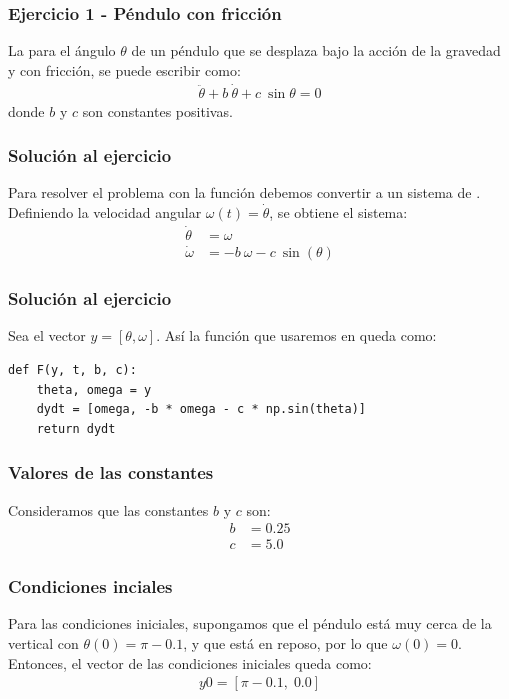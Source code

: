 \documentclass[12pt]{beamer}
\begin{document}
\begin{frame}
\frametitle{Ejercicio 1 - Péndulo con fricción}
La  para el ángulo $\theta$ de un péndulo que se desplaza bajo la acción de la gravedad y con fricción, se puede escribir como:
\pause
\begin{align*}
\ddot{\theta} +  b \: \dot{\theta} +  c \: \sin \theta = 0 
\end{align*}
donde $b$ y $c$ son constantes positivas.
\end{frame}
\begin{frame}
\frametitle{Solución al ejercicio}
Para resolver el problema con la función  debemos convertir a un sistema de .
\\
\bigskip
\pause
Definiendo la velocidad angular $\omega (t) = \dot{\theta}$, se obtiene el sistema:
\pause
\begin{align*}
\dot{\theta} &= \omega \\
\dot{\omega} &= -b \:\omega - c \: \sin(\theta)
\end{align*}
\end{frame}
\begin{frame}[fragile]
\frametitle{Solución al ejercicio}
Sea el vector $y =  [\theta, \omega]$. Así la función que usaremos en \python{} queda como:
\begin{lstlisting}[caption=Función a integrar para el ejecicio del péndulo]
def F(y, t, b, c):
    theta, omega = y
    dydt = [omega, -b * omega - c * np.sin(theta)]
    return dydt
\end{lstlisting}
\end{frame}
\begin{frame}
\frametitle{Valores de las constantes}
Consideramos que las constantes $b$ y $c$ son:
\begin{align*}
b &= 0.25 \\
c &= 5.0
\end{align*} 
\end{frame}
\begin{frame}
\frametitle{Condiciones inciales}
Para las condiciones iniciales, supongamos que el péndulo está muy cerca de la vertical con $\theta(0) = \pi - 0.1$, y que está en reposo, por lo que $\omega(0) = 0$.
\\
\bigskip
\pause
Entonces, el vector de las condiciones iniciales queda como:
\pause
\begin{align*}
y0 =  [\pi - 0.1 , \; 0.0]
\end{align*}
\end{frame}
\end{document}
